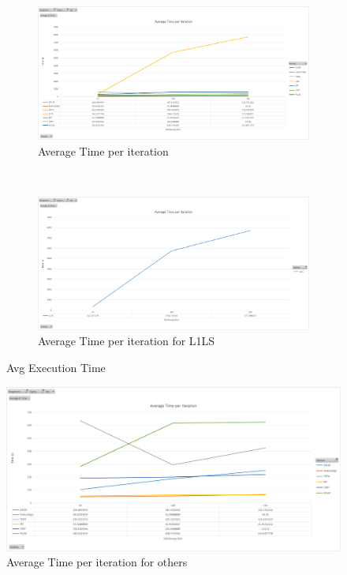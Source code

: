 \documentclass{article} %
\begin{document}
\begin{figure}[h]
        \centering
        \begin{subfigure}[b]{0.5\textwidth}
                \includegraphics[width=\textwidth]{images/graph3}
                \caption{Average Time per iteration}
                \label{fig:avgTime}
        \end{subfigure}%
        ~ %
        \begin{subfigure}[b]{0.5\textwidth}
                \includegraphics[width=\textwidth]{images/graph4}
                \caption{Average Time per iteration for L1LS}
                \label{fig:avgTimeL1LS}
        \end{subfigure}
        \caption{Avg Execution Time}\label{fig:avgExecTime}
\end{figure}

\begin{figure}
	\includegraphics[width=\textwidth]{images/graph5}
    \caption{Average Time per iteration for others}
    \label{fig:avgTimeOthers}
\end{figure}
\end{document}
